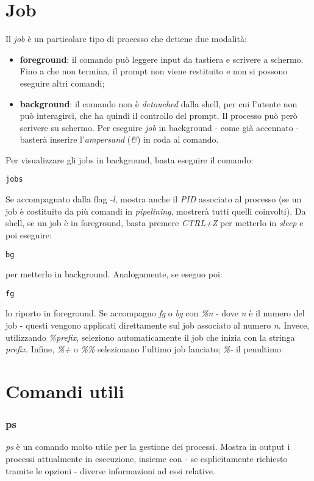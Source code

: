 \section{Job}
Il \textit{job} è un particolare tipo di processo che detiene due modalità:
\begin{itemize}
    \item \textbf{foreground}: il comando può leggere input da tastiera e scrivere a schermo. Fino a che non termina, il prompt non viene restituito e non si possono eseguire altri comandi;
    \item \textbf{background}: il comando non è \textit{detouched} dalla shell, per cui l'utente non può interagirci, che ha quindi il controllo del prompt. Il processo può però scrivere su schermo. Per eseguire \textit{job} in background - come già accennato - basterà inserire l'\textit{ampersand} (\textit{\&}) in coda al comando.
\end{itemize}
Per visualizzare gli jobs in background, basta eseguire il comando:
\begin{lstlisting}
jobs
\end{lstlisting}
Se accompagnato dalla flag \textit{-l}, mostra anche il \textit{PID} associato al processo (se un job è costituito da più comandi in \textit{pipelining}, mostrerà tutti quelli coinvolti).
Da shell, se un job è in foreground, basta premere \textit{CTRL+Z} per metterlo in \textit{sleep} e poi eseguire:
\begin{lstlisting}
bg
\end{lstlisting}
per metterlo in background.
Analogamente, se eseguo poi:
\begin{lstlisting}
fg
\end{lstlisting}
lo riporto in foreground.
Se accompagno \textit{fg} o \textit{bg} con \textit{\%n} - dove \textit{n} è il numero del job - questi vengono applicati direttamente sul job associato al numero \textit{n}.
Invece, utilizzando \textit{\%prefix}, seleziono automaticamente il job che inizia con la stringa \textit{prefix}.
Infine, \textit{\%+} o \textit{\%\%} selezionano l'ultimo job lanciato; \textit{\%-} il penultimo.

\section{Comandi utili}

\subsubsection{ps}
\textit{ps} è un comando molto utile per la gestione dei processi.
Mostra in output i processi attualmente in esecuzione, insieme con - se esplicitamente richiesto tramite le opzioni - diverse informazioni ad essi relative.

